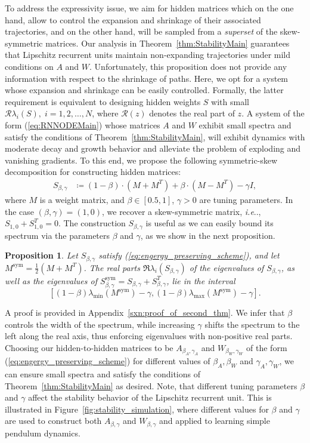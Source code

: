 \documentclass{article} \usepackage{iclr2021_conference,times}
\makeatletter
\newtheorem{proposition}{Proposition}
\newcommand{\sym}{\mathrm{sym}}
\DeclareRobustCommand\onedot{\futurelet\@let@token\@onedot}
\def\@onedot{\ifx\@let@token.\else.\null\fi\xspace}
\def\ie{\emph{i.e}\onedot} \def\Ie{\emph{I.e}\onedot}
\makeatother
\begin{document}
To address the expressivity issue, we aim for hidden matrices which on the one hand, allow to control the expansion and shrinkage of their associated trajectories, and on the other hand, will be sampled from a \emph{superset} of the skew-symmetric matrices. Our analysis in Theorem~\ref{thm:StabilityMain} guarantees that Lipschitz recurrent units maintain non-expanding trajectories under mild conditions on $A$ and $W$. Unfortunately, this proposition does not provide any information with respect to the shrinkage of paths. Here, we opt for a system whose expansion and shrinkage can be easily controlled. Formally, the latter requirement is equivalent to designing hidden weights $S$ with small $\mathcal{R}\lambda_i(S),\; i=1,2,\dots,N$, where $\mathcal{R}(z)$ denotes the real part of $z$. A system of the form (\ref{eq:RNNODEMain}) whose matrices $A$ and $W$ exhibit small spectra and satisfy the conditions of Theorem~\ref{thm:StabilityMain}, will exhibit dynamics with moderate decay and growth behavior and alleviate the problem of exploding and vanishing gradients. To this end, we propose the following symmetric-skew decomposition for constructing hidden matrices:
\begin{align} \label{eq:engergy_preserving_scheme}
	S_{\beta,\gamma} &\coloneqq (1-\beta) \cdot (M+M^T) + \beta \cdot (M-M^T) - \gamma I ,
\end{align}
where $M$ is a weight matrix, and $\beta \in [0.5,1]$, $\gamma > 0$ are tuning parameters. In the case $(\beta,\gamma) = (1,0)$, we recover a skew-symmetric matrix, \ie, $S_{1,0} + S_{1,0}^T = 0$. The construction $S_{\beta, \gamma}$ is useful as we can easily bound its spectrum via the parameters $\beta$ and $\gamma$, as we show in the next proposition. 
\begin{proposition}
\label{thm:our_second_thm}
Let $S_{\beta,\gamma}$ satisfy (\ref{eq:engergy_preserving_scheme}), and let $M^{\sym} = \frac12(M + M^T)$. The real parts $\Re\lambda_i(S_{\beta,\gamma})$ of the eigenvalues of $S_{\beta,\gamma}$, as well as the eigenvalues of $S_{\beta,\gamma}^{\sym} = S_{\beta,\gamma} + S_{\beta,\gamma}^T$, lie in the interval\[[(1 - \beta)\lambda_{\min}(M^{\sym}) - \gamma, (1 - \beta)\lambda_{\max}(M^{\sym}) - \gamma].\]
\end{proposition}
A proof is provided in Appendix~\ref{sxn:proof_of_second_thm}. We infer that $\beta$  controls the width of the spectrum, while increasing $\gamma$ shifts the spectrum to the left along the real axis, thus enforcing eigenvalues with non-positive real parts. Choosing our hidden-to-hidden matrices to be $A_{\beta_A,\gamma_A}$ and $W_{\beta_W,\gamma_W}$ of the form (\ref{eq:engergy_preserving_scheme}) for different values of $\beta_A,\beta_W$ and $\gamma_A,\gamma_W$, we can ensure small spectra and satisfy the conditions of Theorem~\ref{thm:StabilityMain} as desired. 
Note, that different tuning parameters $\beta$ and $\gamma$ affect the stability behavior of the Lipschitz recurrent unit. 
This is illustrated in Figure~\ref{fig:stability_simulation}, where different values for $\beta$ and $\gamma$ are used to construct both $A_{\beta,\gamma}$ and $W_{\beta,\gamma}$ and applied to learning simple pendulum dynamics.
\end{document}
